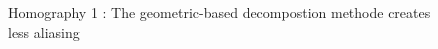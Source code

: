 \begin{figure}
\caption{Homography 1 : The geometric-based decompostion methode creates less aliasing}
\label{Homo1}
\end{figure}

